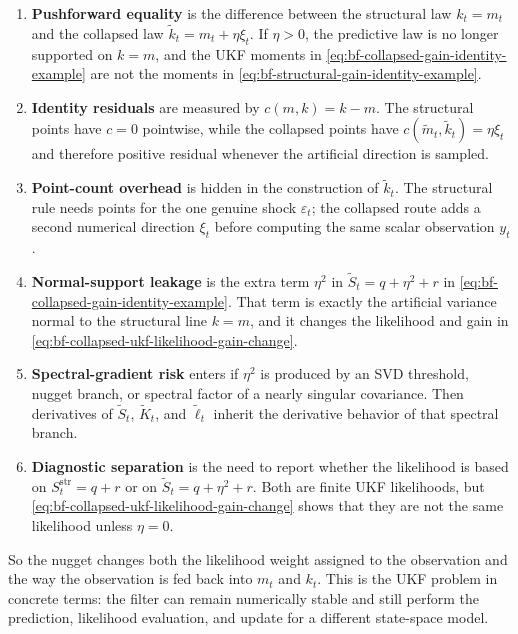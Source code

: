 \begin{enumerate}[label=(\roman*)]
  \item \textbf{Pushforward equality} is the difference between the structural
    law $k_t=m_t$ and the collapsed law
    $\widetilde k_t=m_t+\eta\xi_t$.  If $\eta>0$, the predictive law is no
    longer supported on $k=m$, and the UKF moments in
    \eqref{eq:bf-collapsed-gain-identity-example} are not the moments in
    \eqref{eq:bf-structural-gain-identity-example}.
  \item \textbf{Identity residuals} are measured by
    $c(m,k)=k-m$.  The structural points have $c=0$ pointwise, while the
    collapsed points have
    $c(\widetilde m_t,\widetilde k_t)=\eta\xi_t$ and therefore positive
    residual whenever the artificial direction is sampled.
  \item \textbf{Point-count overhead} is hidden in the construction of
    $\widetilde k_t$.  The structural rule needs points for the one genuine
    shock $\varepsilon_t$; the collapsed route adds a second numerical
    direction $\xi_t$ before computing the same scalar observation $y_t$.
  \item \textbf{Normal-support leakage} is the extra term $\eta^2$ in
    $\widetilde S_t=q+\eta^2+r$ in
    \eqref{eq:bf-collapsed-gain-identity-example}.  That term is exactly the
    artificial variance normal to the structural line $k=m$, and it changes the
    likelihood and gain in
    \eqref{eq:bf-collapsed-ukf-likelihood-gain-change}.
  \item \textbf{Spectral-gradient risk} enters if $\eta^2$ is produced by an
    SVD threshold, nugget branch, or spectral factor of a nearly singular
    covariance.  Then derivatives of
    $\widetilde S_t$, $\widetilde K_t$, and $\widetilde\ell_t$ inherit the
    derivative behavior of that spectral branch.
  \item \textbf{Diagnostic separation} is the need to report whether the
    likelihood is based on $S_t^{\mathrm{str}}=q+r$ or on
    $\widetilde S_t=q+\eta^2+r$.  Both are finite UKF likelihoods, but
    \eqref{eq:bf-collapsed-ukf-likelihood-gain-change} shows that they are not
    the same likelihood unless $\eta=0$.
\end{enumerate}
So the nugget changes both the likelihood weight assigned to the observation
and the way the observation is fed back into $m_t$ and $k_t$.  This is the UKF
problem in concrete terms: the filter can remain numerically stable and still
perform the prediction, likelihood evaluation, and update for a different
state-space model.

